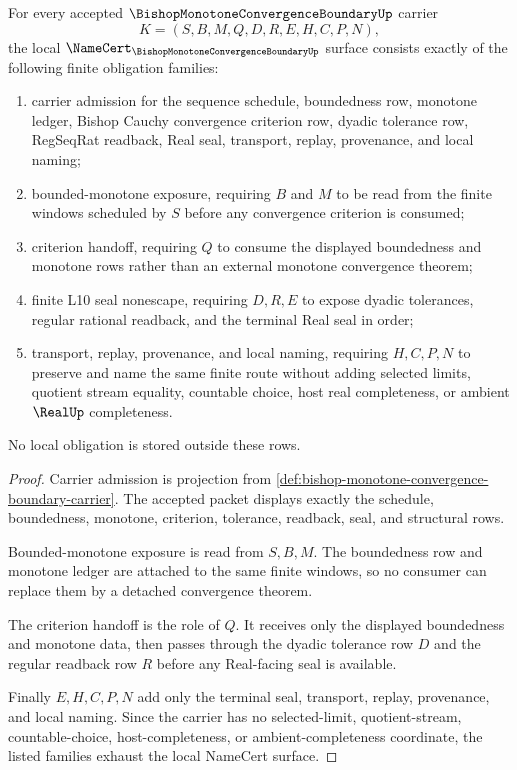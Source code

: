 \begin{theorem}
\label{thm:bishop-monotone-convergence-boundary-namecert-obligations}
For every accepted $\BishopMonotoneConvergenceBoundaryUp$ carrier
$$
K=(S,B,M,Q,D,R,E,H,C,P,N),
$$
the local $\NameCert_{\BishopMonotoneConvergenceBoundaryUp}$ surface consists exactly of the following finite obligation families:
\begin{enumerate}
\item carrier admission for the sequence schedule, boundedness row, monotone ledger, Bishop Cauchy convergence criterion row, dyadic tolerance row, RegSeqRat readback, Real seal, transport, replay, provenance, and local naming;
\item bounded-monotone exposure, requiring $B$ and $M$ to be read from the finite windows scheduled by $S$ before any convergence criterion is consumed;
\item criterion handoff, requiring $Q$ to consume the displayed boundedness and monotone rows rather than an external monotone convergence theorem;
\item finite L10 seal nonescape, requiring $D,R,E$ to expose dyadic tolerances, regular rational readback, and the terminal Real seal in order;
\item transport, replay, provenance, and local naming, requiring $H,C,P,N$ to preserve and name the same finite route without adding selected limits, quotient stream equality, countable choice, host real completeness, or ambient $\RealUp$ completeness.
\end{enumerate}
No local obligation is stored outside these rows.
\end{theorem}
\begin{proof}
Carrier admission is projection from \autoref{def:bishop-monotone-convergence-boundary-carrier}. The accepted packet displays exactly the schedule, boundedness, monotone, criterion, tolerance, readback, seal, and structural rows.

Bounded-monotone exposure is read from $S,B,M$. The boundedness row and monotone ledger are attached to the same finite windows, so no consumer can replace them by a detached convergence theorem.

The criterion handoff is the role of $Q$. It receives only the displayed boundedness and monotone data, then passes through the dyadic tolerance row $D$ and the regular readback row $R$ before any Real-facing seal is available.

Finally $E,H,C,P,N$ add only the terminal seal, transport, replay, provenance, and local naming. Since the carrier has no selected-limit, quotient-stream, countable-choice, host-completeness, or ambient-completeness coordinate, the listed families exhaust the local NameCert surface.
\end{proof}


